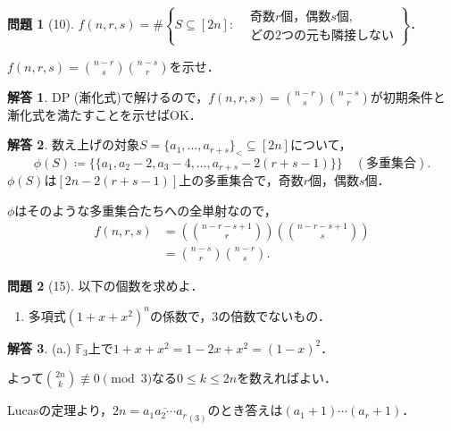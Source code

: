 \documentclass[xelatex,ja=standard,a4paper,14pt,everyparhook=compat]{bxjsarticle}
\newcommand{\paren}[1]{\left(#1\right)}
\newcommand{\bbF}{\mathbb{F}}
\theoremstyle{definition}
\newtheorem*{problem}{問題}
\newtheorem*{answer}{解答}
\begin{document}
\begin{problem}[10]
$f(n,r,s) = \#\left\{S \subseteq [2n] : \begin{aligned} & \text{奇数$r$個，偶数$s$個}, \\ & \text{どの$2$つの元も隣接しない} \end{aligned} \right\}$．

$f(n,r,s) = \binom{n-r}{s} \binom{n-s}{r}$を示せ．
\end{problem}
\begin{answer}
    DP (漸化式)で解けるので，$f(n,r,s)=\binom{n-r}{s}\binom{n-s}{r}$が初期条件と漸化式を満たすことを示せばOK．
\end{answer}
\begin{answer}
    数え上げの対象$S = \{a_1,\ldots,a_{r+s}\}_< \subseteq [2n]$について， \begin{equation*}
        \phi(S) \coloneqq \{\{a_1, a_2 - 2, a_3 - 4, \ldots, a_{r+s} - 2(r+s-1)\}\} \quad (\text{多重集合}).
    \end{equation*}
    $\phi(S)$は$[2n - 2(r+s-1)]$上の多重集合で，奇数$r$個，偶数$s$個．

    $\phi$はそのような多重集合たちへの全単射なので， \begin{align*}
        f(n,r,s) & = \paren{\binom{n-r-s+1}{r}} \paren{\binom{n-r-s+1}{s}} \\
                 & = \binom{n-s}{r} \binom{n-r}{s}.
    \end{align*}
\end{answer}

\begin{problem}[15]
以下の個数を求めよ．
\begin{enumerate}
    \item 多項式$(1+x+x^2)^n$の係数で，$3$の倍数でないもの．
\end{enumerate}
\end{problem}
\begin{answer}
    (a.) $\bbF_3$上で$1+x+x^2 = 1-2x+x^2 = (1-x)^2$．

    よって$\binom{2n}{k} \not\equiv 0 \pmod 3$なる$0 \leq k \leq 2n$を数えればよい．

    Lucasの定理より，$2n = \overline{a_1a_2\cdots a_r}_{(3)}$のとき答えは$(a_1+1)\cdots(a_r+1)$．
\end{answer}
\end{document}
